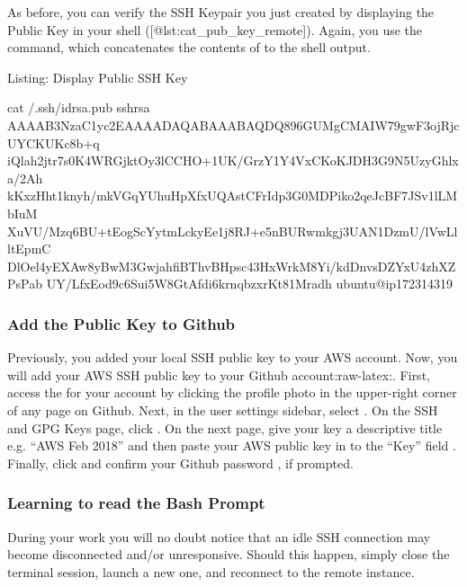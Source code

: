 \documentclass[letterpaper,10pt,english]{sphinxmanual}
\begin{document}
As before, you can verify the SSH Keypair you just created by displaying
the Public Key in your shell ({[}@lst:cat\_pub\_key\_remote{]}). Again, you
use the  command, which concatenates the contents of
 to the shell output.

Listing: Display Public SSH Key

%
\begin{sphinxVerbatim}[commandchars=\\\{\}]
\PYGZdl{} cat \PYGZti{}/.ssh/id\PYGZus{}rsa.pub
ssh\PYGZhy{}rsa
AAAAB3NzaC1yc2EAAAADAQABAAABAQDQ896GUMgCMAIW79gwF3ojRjcUYCKUKc8b+q
iQlah2jtr7s0K4WRGjktOy3lCCHO+1UK/GrzY1Y4VxCKoKJDH3G9N5UzyGhlxa/2Ah
kKxzHht1knyh/mkVGqYUhuHpXfxUQAstCFrIdp3G0MDPiko2qeJcBF7JSv1lLMbIuM
XuVU/Mzq6BU+tEogScYytmLckyEe1j8RJ+e5nBURwmkgj3UAN1DzmU/lVwLlltEpmC
DlOel4yEXAw8yBwM3GwjahfiBThvBHpsc43HxWrkM8Yi/kdDnvsDZYxU4zhXZPsPab
UY/LfxEod9c6Sui5W8GtAfdi6krnqbzxrKt81Mradh ubuntu@ip\PYGZhy{}172\PYGZhy{}31\PYGZhy{}43\PYGZhy{}19
\end{sphinxVerbatim}


\subsubsection{Add the Public Key to Github}
\label{\detokenize{02-elastic-compute-cloud:Add-the-Public-Key-to-Github}}
Previously, you added your local SSH public key to your AWS account.
Now, you will add your AWS SSH public key to your Github
account:raw-latex:.
First, access the  for your account by clicking the profile
photo in the upper-right corner of any page on Github. Next, in the user
settings sidebar, select . On the SSH and GPG Keys
page, click . On the next page, give your key a
descriptive title e.g. “AWS Feb 2018” and then paste your AWS public key
in to the “Key” field . Finally, click  and confirm your
Github password , if prompted.


\subsubsection{Learning to read the Bash Prompt}
\label{\detokenize{02-elastic-compute-cloud:Learning-to-read-the-Bash-Prompt}}
During your work you will no doubt notice that an idle SSH connection
may become disconnected and/or unresponsive. Should this happen, simply
close the terminal session, launch a new one, and reconnect to the
remote instance.
\end{document}
